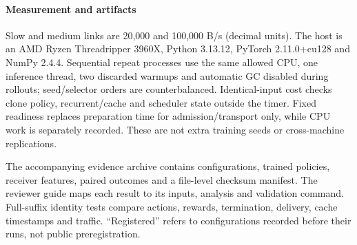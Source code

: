 \documentclass[10pt,a4paper]{article}
\begin{document}
\paragraph{Measurement and artifacts}
Slow and medium links are 20,000 and 100,000 B/s (decimal units). The host is an AMD Ryzen Threadripper 3960X, Python 3.13.12, PyTorch 2.11.0+cu128 and NumPy 2.4.4. Sequential repeat processes use the same allowed CPU, one inference thread, two discarded warmups and automatic GC disabled during rollouts; seed/selector orders are counterbalanced. Identical-input cost checks clone policy, recurrent/cache and scheduler state outside the timer. Fixed readiness replaces preparation time for admission/transport only, while CPU work is separately recorded. These are not extra training seeds or cross-machine replications.

The accompanying evidence archive contains configurations, trained policies, receiver features, paired outcomes and a file-level checksum manifest. The reviewer guide maps each result to its inputs, analysis and validation command. Full-suffix identity tests compare actions, rewards, termination, delivery, cache timestamps and traffic. ``Registered'' refers to configurations recorded before their runs, not public preregistration.
\FloatBarrier
\end{document}
